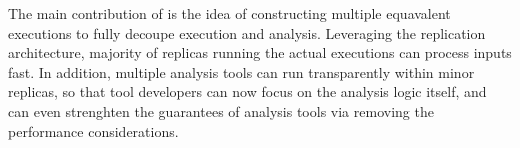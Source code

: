 




The main contribution of \xxx is the idea of constructing multiple equavalent 
executions to fully decoupe execution and analysis. Leveraging the replication 
architecture, majority of replicas running the actual executions can process 
inputs fast. In addition, multiple analysis tools can run transparently within 
minor replicas, so that tool developers can now focus on the analysis logic 
itself, and can even strenghten the guarantees of analysis tools via removing 
the performance considerations.










